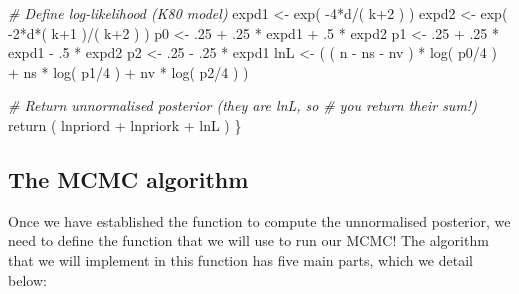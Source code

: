 \documentclass[
]{article}
\newenvironment{Shaded}{\begin{snugshade}}{\end{snugshade}}
\newcommand{\CommentTok}[1]{\textcolor[rgb]{0.56,0.35,0.01}{\textit{#1}}}
\newcommand{\DecValTok}[1]{\textcolor[rgb]{0.00,0.00,0.81}{#1}}
\newcommand{\FunctionTok}[1]{\textcolor[rgb]{0.00,0.00,0.00}{#1}}
\newcommand{\NormalTok}[1]{#1}
\newcommand{\OtherTok}[1]{\textcolor[rgb]{0.56,0.35,0.01}{#1}}
\newcommand{\SpecialCharTok}[1]{\textcolor[rgb]{0.00,0.00,0.00}{#1}}
\begin{document}
\begin{Shaded}
\begin{Highlighting}[]
  \CommentTok{\# Define log{-}likelihood (K80 model)}
\NormalTok{  expd1 }\OtherTok{\textless{}{-}} \FunctionTok{exp}\NormalTok{( }\SpecialCharTok{{-}}\DecValTok{4}\SpecialCharTok{*}\NormalTok{d}\SpecialCharTok{/}\NormalTok{( k}\SpecialCharTok{+}\DecValTok{2}\NormalTok{ ) )}
\NormalTok{  expd2 }\OtherTok{\textless{}{-}} \FunctionTok{exp}\NormalTok{( }\SpecialCharTok{{-}}\DecValTok{2}\SpecialCharTok{*}\NormalTok{d}\SpecialCharTok{*}\NormalTok{( k}\SpecialCharTok{+}\DecValTok{1}\NormalTok{ )}\SpecialCharTok{/}\NormalTok{( k}\SpecialCharTok{+}\DecValTok{2}\NormalTok{ ) )}
\NormalTok{  p0 }\OtherTok{\textless{}{-}}\NormalTok{ .}\DecValTok{25} \SpecialCharTok{+}\NormalTok{ .}\DecValTok{25} \SpecialCharTok{*}\NormalTok{ expd1 }\SpecialCharTok{+}\NormalTok{ .}\DecValTok{5} \SpecialCharTok{*}\NormalTok{ expd2}
\NormalTok{  p1 }\OtherTok{\textless{}{-}}\NormalTok{ .}\DecValTok{25} \SpecialCharTok{+}\NormalTok{ .}\DecValTok{25} \SpecialCharTok{*}\NormalTok{ expd1 }\SpecialCharTok{{-}}\NormalTok{ .}\DecValTok{5} \SpecialCharTok{*}\NormalTok{ expd2}
\NormalTok{  p2 }\OtherTok{\textless{}{-}}\NormalTok{ .}\DecValTok{25} \SpecialCharTok{{-}}\NormalTok{ .}\DecValTok{25} \SpecialCharTok{*}\NormalTok{ expd1}
\NormalTok{  lnL }\OtherTok{\textless{}{-}}\NormalTok{ ( ( n }\SpecialCharTok{{-}}\NormalTok{ ns }\SpecialCharTok{{-}}\NormalTok{ nv ) }\SpecialCharTok{*} \FunctionTok{log}\NormalTok{( p0}\SpecialCharTok{/}\DecValTok{4}\NormalTok{ ) }\SpecialCharTok{+}\NormalTok{ ns }\SpecialCharTok{*} \FunctionTok{log}\NormalTok{( p1}\SpecialCharTok{/}\DecValTok{4}\NormalTok{ ) }\SpecialCharTok{+}\NormalTok{ nv }\SpecialCharTok{*} \FunctionTok{log}\NormalTok{( p2}\SpecialCharTok{/}\DecValTok{4}\NormalTok{ ) )}

  \CommentTok{\# Return unnormalised posterior (they are lnL, so }
  \CommentTok{\# you return their sum!)}
  \FunctionTok{return}\NormalTok{ ( lnpriord }\SpecialCharTok{+}\NormalTok{ lnpriork }\SpecialCharTok{+}\NormalTok{ lnL )}
\NormalTok{\}}
\end{Highlighting}
\end{Shaded}

\hypertarget{the-mcmc-algorithm}{%
\subsection{The MCMC algorithm}\label{the-mcmc-algorithm}}

Once we have established the function to compute the unnormalised
posterior, we need to define the function that we will use to run our
MCMC! The algorithm that we will implement in this function has five
main parts, which we detail below:
\end{document}
